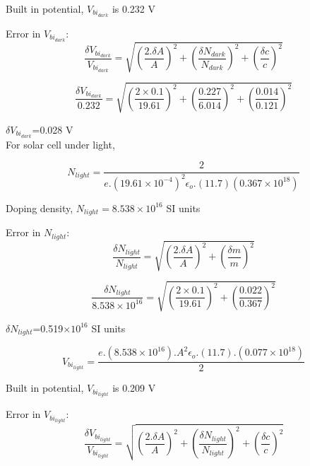 \documentclass[a4paper, amsfonts, amssymb, amsmath, reprint, showkeys, nofootinbib, twoside]{revtex4-1}
\begin{document}
Built in potential, $V_{bi_{dark}}$ is 0.232 V

Error in $V_{bi_{dark}}$:
\begin{equation}
	\frac{\delta V_{bi_{dark}}}{ V_{bi_{dark}}}=\sqrt{\left( \frac{2.\delta A}{A}\right) ^{2}+\left( \frac{\delta N_{dark}}{N_{dark}}\right) ^{2}+\left( \frac{{\delta c}}{c}\right) ^{2}}
\end{equation}

\begin{equation}
	\frac{\delta V_{bi_{dark}}}{ 0.232}=\sqrt{\left( \frac{2\times0.1}{19.61}\right) ^{2}+\left( \frac{0.227}{6.014}\right) ^{2}+\left( \frac{{0.014}}{0.121}\right) ^{2}}
\end{equation}

$\delta V_{bi_{dark}}$=0.028 V
\newline
\\
For solar cell under light,

\begin{equation}
	N_{light}=\frac{2}{e.(19.61\times10^{-4})^{2} \epsilon_o.(11.7)(0.367\times10^{18})}
\end{equation}

Doping density, $N_{light}=8.538\times10^{16}$ SI units

Error in $N_{light}$:
\begin{equation}
	\frac{\delta N_{light}}{ N_{light}}=\sqrt{\left( \frac{2.\delta A}{A}\right) ^{2}+\left( \frac{\delta m}{m}\right) ^{2}}
\end{equation}

\begin{equation}
	\frac{\delta N_{light}}{ 8.538\times10^{16}}=\sqrt{\left( \frac{2\times0.1}{19.61}\right) ^{2}+\left( \frac{0.022}{0.367}\right) ^{2}}
\end{equation}

$\delta N_{light}$=0.519$\times10^{16}$ SI units

\begin{equation}\label{vbl}
	V_{bi_{light}}=\frac{e.(8.538\times10^{16}).A^{2} \epsilon_o.(11.7).(0.077\times10^{18})}{2}
\end{equation}

Built in potential, $V_{bi_{light}}$ is 0.209 V

Error in $V_{bi_{light}}$:
\begin{equation}
	\frac{\delta V_{bi_{light}}}{ V_{bi_{light}}}=\sqrt{\left( \frac{2.\delta A}{A}\right) ^{2}+\left( \frac{\delta N_{light}}{N_{light}}\right) ^{2}+\left( \frac{{\delta c}}{c}\right) ^{2}}
\end{equation}
\end{document}

